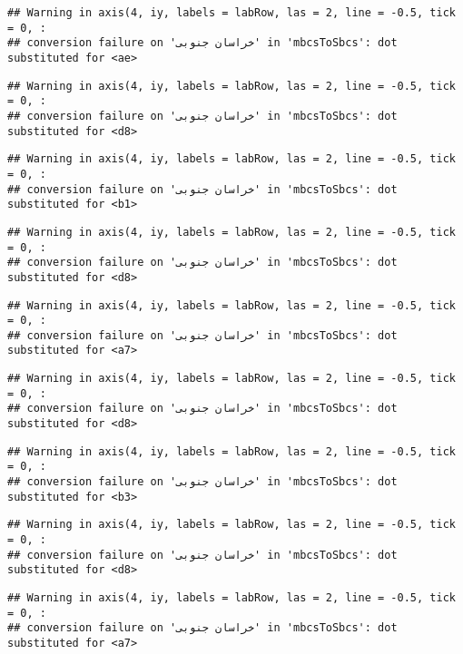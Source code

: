 \documentclass[
]{article}
\begin{document}
\begin{verbatim}
## Warning in axis(4, iy, labels = labRow, las = 2, line = -0.5, tick = 0, :
## conversion failure on 'خراسان جنوبی' in 'mbcsToSbcs': dot substituted for <ae>
\end{verbatim}

\begin{verbatim}
## Warning in axis(4, iy, labels = labRow, las = 2, line = -0.5, tick = 0, :
## conversion failure on 'خراسان جنوبی' in 'mbcsToSbcs': dot substituted for <d8>
\end{verbatim}

\begin{verbatim}
## Warning in axis(4, iy, labels = labRow, las = 2, line = -0.5, tick = 0, :
## conversion failure on 'خراسان جنوبی' in 'mbcsToSbcs': dot substituted for <b1>
\end{verbatim}

\begin{verbatim}
## Warning in axis(4, iy, labels = labRow, las = 2, line = -0.5, tick = 0, :
## conversion failure on 'خراسان جنوبی' in 'mbcsToSbcs': dot substituted for <d8>
\end{verbatim}

\begin{verbatim}
## Warning in axis(4, iy, labels = labRow, las = 2, line = -0.5, tick = 0, :
## conversion failure on 'خراسان جنوبی' in 'mbcsToSbcs': dot substituted for <a7>
\end{verbatim}

\begin{verbatim}
## Warning in axis(4, iy, labels = labRow, las = 2, line = -0.5, tick = 0, :
## conversion failure on 'خراسان جنوبی' in 'mbcsToSbcs': dot substituted for <d8>
\end{verbatim}

\begin{verbatim}
## Warning in axis(4, iy, labels = labRow, las = 2, line = -0.5, tick = 0, :
## conversion failure on 'خراسان جنوبی' in 'mbcsToSbcs': dot substituted for <b3>
\end{verbatim}

\begin{verbatim}
## Warning in axis(4, iy, labels = labRow, las = 2, line = -0.5, tick = 0, :
## conversion failure on 'خراسان جنوبی' in 'mbcsToSbcs': dot substituted for <d8>
\end{verbatim}

\begin{verbatim}
## Warning in axis(4, iy, labels = labRow, las = 2, line = -0.5, tick = 0, :
## conversion failure on 'خراسان جنوبی' in 'mbcsToSbcs': dot substituted for <a7>
\end{verbatim}
\end{document}
